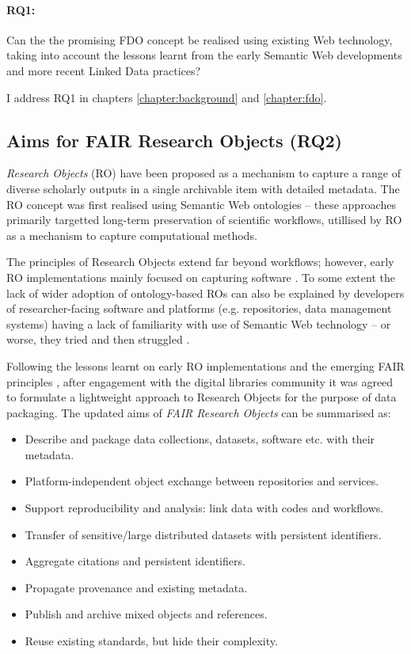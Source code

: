 \paragraph{RQ1:}\label{rq1} 
Can the the promising FDO concept be realised using existing Web technology, taking into account the lessons learnt from the early Semantic Web developments and more recent Linked Data practices?

I address RQ1 in chapters \ref{chapter:background} and \ref{chapter:fdo}.


\subsection{Aims for FAIR Research Objects (RQ2)}
\label{intro:rq2}

\emph{Research Objects} (RO) \cite{Bechhofer 2013} have been proposed as a mechanism to capture a range of diverse scholarly outputs in a single archivable item with detailed metadata. The RO concept was first realised using Semantic Web ontologies \cite{myExperiment 2009,Belhajjame 2015} -- these approaches primarily targetted long-term preservation of scientific workflows, utillised by RO as a mechanism to capture computational methods.

The principles of Research Objects extend far beyond workflows; however, early RO implementations mainly focused on capturing software \cite{Goble 2018}. To some extent the lack of wider adoption of ontology-based ROs can also be explained by developers of researcher-facing software and platforms (e.g. repositories, data management systems) having a lack of familiarity with use of Semantic Web technology -- or worse, they tried and then struggled \cite{Carriero 2010,Tudorache 2020}.

Following the lessons learnt on early RO implementations and the emerging FAIR principles \cite{Wilkinson 2016,Jacobsen 2020}, after engagement with the digital libraries community it was agreed to formulate a lightweight approach to Research Objects \cite{Sefton 2018,Ó Carragáin 2019b} for the purpose of data packaging. The updated aims of \emph{FAIR Research Objects} can be summarised as:
 
\begin{itemize}
    \item Describe and package data collections, datasets, software etc. with their metadata.
    \item Platform-independent object exchange between repositories and services.
    \item Support reproducibility and analysis: link data with codes and workflows.
    \item Transfer of sensitive/large distributed datasets with persistent identifiers.
    \item Aggregate citations and persistent identifiers.
    \item Propagate provenance and existing metadata.
    \item Publish and archive mixed objects and references.
    \item Reuse existing standards, but hide their complexity.
\end{itemize}

